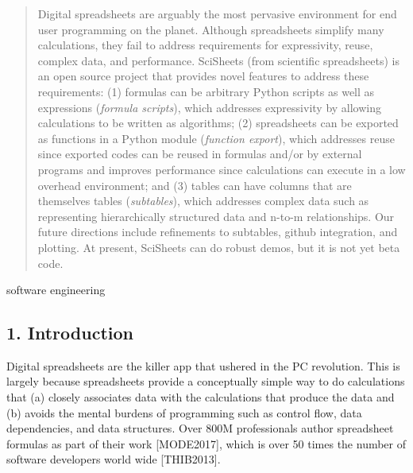 \documentclass[letterpaper,compsoc,twoside]{IEEEtran}
\begin{document}
\newcommand*{\docutilsroleref}{\ref}
\newcommand*{\docutilsrolelabel}{\label}
\providecommand*\DUrolecite[1]{\cite{#1}}
\begin{abstract}Digital spreadsheets are arguably the most pervasive environment for
end user programming on the planet.
Although spreadsheets simplify many calculations, they fail
to address requirements for expressivity, reuse, complex data, and performance.
SciSheets (from \textquotedbl{}scientific spreadsheets\textquotedbl{}) is an open source project that provides
novel features to address these requirements: (1)
formulas can be arbitrary Python scripts as well as expressions (\emph{formula scripts}),
which addresses
expressivity by allowing
calculations to be written as algorithms;
(2) spreadsheets
can be exported as functions in a Python module
(\emph{function export}), which
addresses reuse since
exported codes
can be reused in formulas and/or by
external programs and improves performance
since calculations can execute in a
low overhead environment;
and
(3) tables can have columns that are themselves tables
(\emph{subtables}), which addresses
complex data
such as representing hierarchically structured
data and n-to-m relationships.
Our future directions include
refinements to subtables, github integration,
and plotting.
At present, SciSheets can do robust demos, but it is
not yet beta code.\end{abstract}\begin{IEEEkeywords}software engineering\end{IEEEkeywords}

\subsection{1. Introduction%
  \label{introduction}%
}


Digital spreadsheets are the \textquotedbl{}killer app\textquotedbl{} that ushered in the PC revolution.
This is largely because spreadsheets provide a conceptually simple way to do calculations that
(a) closely associates data with the calculations that produce the data and
(b) avoids the mental burdens of programming
such as
control flow, data dependencies, and data structures.
Over 800M professionals author spreadsheet formulas as part of their work
{[}MODE2017{]},
which is over 50 times the number
of software developers world wide {[}THIB2013{]}.
\end{document}
